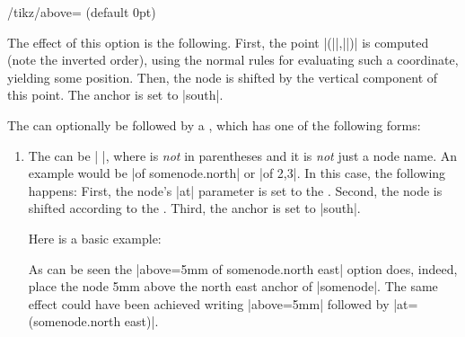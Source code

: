 \begin{key}{/tikz/above= (default 0pt)}
\begin{enumerate}
            The effect of this option is the following. First, the point
            |(||,||)|
            is computed (note the inverted order), using the normal rules for
            evaluating such a coordinate, yielding some position. Then, the
            node is shifted by the vertical component of this point. The anchor
            is set to |south|.
\begin{codeexample}[preamble={\usetikzlibrary{positioning}}]
\end{codeexample}
    \end{enumerate}
    The  can optionally be followed by a ,
    which has one of the following forms:
    \begin{enumerate}
        \item The  can be
            | |, where  is
            \emph{not} in parentheses and it is \emph{not} just a node name. An
            example would be |of somenode.north| or |of 2,3|. In this case, the
            following happens: First, the node's |at| parameter is set to the
            . Second, the node is shifted according to the
            . Third, the anchor is set to |south|.

            Here is a basic example:
\begin{codeexample}[preamble={\usetikzlibrary{positioning}}]
\end{codeexample}
            As can be seen the |above=5mm of somenode.north east| option does,
            indeed, place the node 5mm above the north east anchor of
            |somenode|. The same effect could have been achieved writing
            |above=5mm| followed by |at=(somenode.north east)|.


\end{enumerate}
\end{key}
